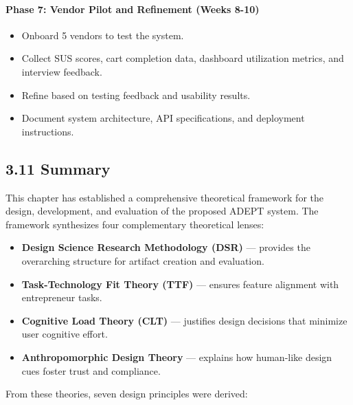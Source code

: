 \documentclass[12pt,a4paper]{article}
\begin{document}
\paragraph{Phase 7: Vendor Pilot and Refinement (Weeks 8-10)}

\begin{itemize}
    \item Onboard 5 vendors to test the system.
    \item Collect SUS scores, cart completion data, dashboard utilization metrics, and interview feedback.
    \item Refine based on testing feedback and usability results.
    \item Document system architecture, API specifications, and deployment instructions.
\end{itemize}

\subsection{3.11 Summary}

This chapter has established a comprehensive theoretical framework for the design, development, and evaluation of the proposed ADEPT system. The framework synthesizes four complementary theoretical lenses:

\begin{itemize}
    \item \textbf{Design Science Research Methodology (DSR)} --- provides the overarching structure for artifact creation and evaluation.
    \item \textbf{Task-Technology Fit Theory (TTF)} --- ensures feature alignment with entrepreneur tasks.
    \item \textbf{Cognitive Load Theory (CLT)} --- justifies design decisions that minimize user cognitive effort.
    \item \textbf{Anthropomorphic Design Theory} --- explains how human-like design cues foster trust and compliance.
\end{itemize}

From these theories, seven design principles were derived:
\end{document}
